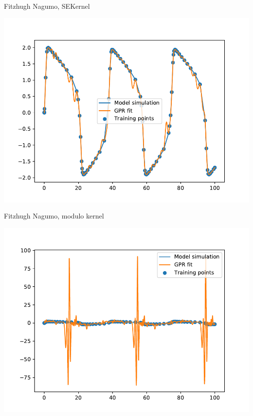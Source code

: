 \documentclass[presentation]{beamer}
\begin{document}
\begin{frame}[plain,label={sec:org618809b}]{Fitzhugh Nagumo, SEKernel}
\begin{center}
\includegraphics[width=\textwidth]{./FH_SEKernel.pdf}
\end{center}
\end{frame}

\begin{frame}[plain,label={sec:orge16959a}]{Fitzhugh Nagumo, modulo kernel}
\begin{center}
\includegraphics[width=\textwidth]{./FH_Modulo.pdf}
\end{center}
\end{frame}
\end{document}
